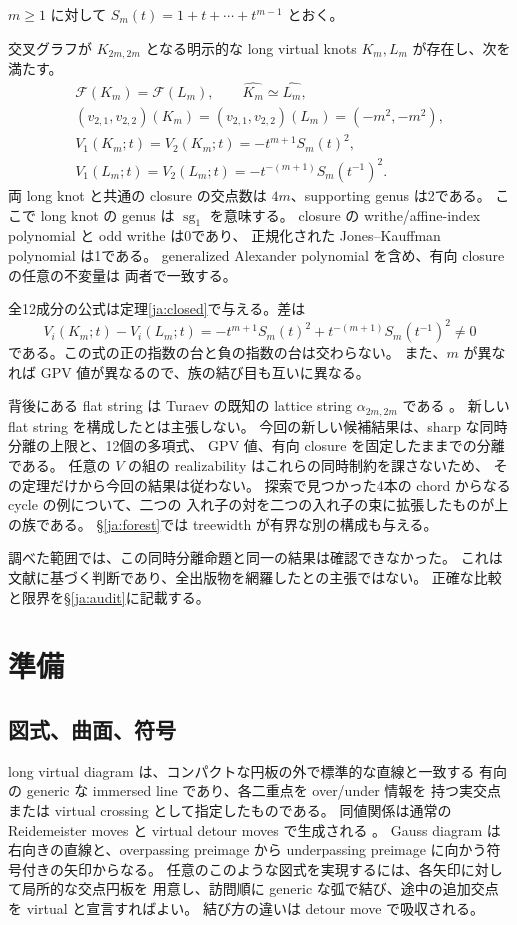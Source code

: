 \documentclass[12pt]{amsart}
\theoremstyle{definition}
\theoremstyle{remark}
\numberwithin{equation}{section}
\newcommand{\Package}{\mathcal F}
\newcommand{\sg}{\operatorname{sg}}
\newcommand{\clK}[1]{\widehat{#1}}
\begin{document}
$m\ge1$ に対して $S_m(t)=1+t+\cdots+t^{m-1}$ とおく。
\begin{jthm}[明示的な無限族]\label{ja:main}
交叉グラフが $K_{2m,2m}$ となる明示的な long virtual knots
$K_m,L_m$ が存在し、次を満たす。
\begin{gather*}
\Package(K_m)=\Package(L_m),\qquad\clK{K_m}\simeq\clK{L_m},\\
(v_{2,1},v_{2,2})(K_m)=(v_{2,1},v_{2,2})(L_m)=(-m^2,-m^2),\\
V_1(K_m;t)=V_2(K_m;t)=-t^{m+1}S_m(t)^2,\\
V_1(L_m;t)=V_2(L_m;t)=-t^{-(m+1)}S_m(t^{-1})^2.
\end{gather*}
両 long knot と共通の closure の交点数は $4m$、supporting genus は2である。
ここで long knot の genus は $\sg_1$ を意味する。
closure の writhe/affine-index polynomial と odd writhe は0であり、
正規化された Jones--Kauffman polynomial は1である。
generalized Alexander polynomial を含め、有向 closure の任意の不変量は
両者で一致する。
\end{jthm}
全12成分の公式は定理\ref{ja:closed}で与える。差は
\begin{equation}\label{ja:diff}
V_i(K_m;t)-V_i(L_m;t)
=-t^{m+1}S_m(t)^2+t^{-(m+1)}S_m(t^{-1})^2\ne0
\end{equation}
である。この式の正の指数の台と負の指数の台は交わらない。
また、$m$ が異なれば GPV 値が異なるので、族の結び目も互いに異なる。

背後にある flat string は Turaev の既知の lattice string
$\alpha_{2m,2m}$ である \cite[\S3.3(1)]{Turaev}。
新しい flat string を構成したとは主張しない。
今回の新しい候補結果は、sharp な同時分離の上限と、12個の多項式、
GPV 値、有向 closure を固定したままでの分離である。
任意の $V$ の組の realizability はこれらの同時制約を課さないため、
その定理だけから今回の結果は従わない。
探索で見つかった4本の chord からなる cycle の例について、二つの
入れ子の対を二つの入れ子の束に拡張したものが上の族である。
\S\ref{ja:forest}では treewidth が有界な別の構成も与える。

調べた範囲では、この同時分離命題と同一の結果は確認できなかった。
これは文献に基づく判断であり、全出版物を網羅したとの主張ではない。
正確な比較と限界を\S\ref{ja:audit}に記載する。

\section{準備}
\subsection{図式、曲面、符号}
long virtual diagram は、コンパクトな円板の外で標準的な直線と一致する
有向の generic な immersed line であり、各二重点を over/under 情報を
持つ実交点または virtual crossing として指定したものである。
同値関係は通常の Reidemeister moves と virtual detour moves で生成される
\cite[\S\S2--3]{Kauffman}。
Gauss diagram は右向きの直線と、overpassing preimage から
underpassing preimage に向かう符号付きの矢印からなる。
任意のこのような図式を実現するには、各矢印に対して局所的な交点円板を
用意し、訪問順に generic な弧で結び、途中の追加交点を virtual と宣言すればよい。
結び方の違いは detour move で吸収される。
\end{document}
